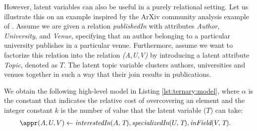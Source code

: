 
However, latent variables can also be useful in a purely relational setting.
Let us illustrate this on an example inspired by the ArXiv community analysis example of \cite{Gopalan2013Efficient}. 
Assume we are given a relation \textit{publishedIn} with attributes \textit{Author}, \textit{University}, and \textit{Venue},
specifying that an author belonging to a particular university publishes in a particular venue. Furthermore, assume we want to factorize this relation into 
the relation  \textit{\appr(A,U,V)} by introducing a latent attribute \textit{Topic}, denoted as $T$. 
The latent topic variable clusters authors, universities and venues together in such a way that their join results in publications. 


We obtain the following high-level model in Listing \ref{lst:ternary:model}, 
where $\alpha$ is the constant that indicates the relative cost of overcovering an element and the integer constant $k$ is the number of value that the latent variable ($T$) can take:
\begin{align*}
& \appr(A,U,V) \leftarrow \textit{interestedIn}(A, \textit{T}), \textit{specializedIn}(U, \textit{T}), \textit{inField}(V, \textit{T}).
\end{align*}


